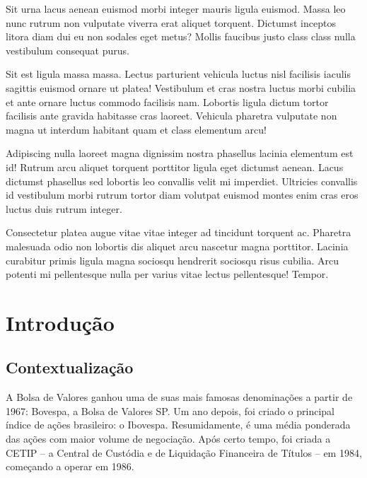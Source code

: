 \documentclass[grad,numbers]{coppe}
\begin{document}
  \begin{foreignabstract}
Sit urna lacus aenean euismod morbi integer mauris ligula euismod. Massa leo nunc rutrum non vulputate viverra erat aliquet torquent. Dictumst inceptos litora diam dui eu non sodales eget metus? Mollis faucibus justo class class nulla vestibulum consequat purus.

Sit est ligula massa massa. Lectus parturient vehicula luctus nisl facilisis iaculis sagittis euismod ornare ut platea! Vestibulum et cras nostra luctus morbi cubilia et ante ornare luctus commodo facilisis nam. Lobortis ligula dictum tortor facilisis ante gravida habitasse cras laoreet. Vehicula pharetra vulputate non magna ut interdum habitant quam et class elementum arcu!

Adipiscing nulla laoreet magna dignissim nostra phasellus lacinia elementum est id! Rutrum arcu aliquet torquent porttitor ligula eget dictumst aenean. Lacus dictumst phasellus sed lobortis leo convallis velit mi imperdiet. Ultricies convallis id vestibulum morbi rutrum tortor diam volutpat euismod montes enim cras eros luctus duis rutrum integer.

Consectetur platea augue vitae vitae integer ad tincidunt torquent ac. Pharetra malesuada odio non lobortis dis aliquet arcu nascetur magna porttitor. Lacinia curabitur primis ligula magna sociosqu hendrerit sociosqu risus cubilia. Arcu potenti mi pellentesque nulla per varius vitae lectus pellentesque! Tempor.
  \end{foreignabstract}
  \tableofcontents

  \listoffigures

  \listoftables

  \printlosymbols
  \printloabbreviations

  \mainmatter

  \hypertarget{introduuxe7uxe3o}{%
  \chapter{Introdução}\label{introduuxe7uxe3o}}
  
  \hypertarget{contextualizauxe7uxe3o}{%
  \section{Contextualização}\label{contextualizauxe7uxe3o}}
  
  A Bolsa de Valores ganhou uma de suas mais famosas denominações a partir de 1967: Bovespa, a Bolsa de Valores SP. Um ano depois, foi criado o principal índice de ações brasileiro: o Ibovespa. Resumidamente, é uma média ponderada das ações com maior volume de negociação. Após certo tempo, foi criada a CETIP -- a Central de Custódia e de Liquidação Financeira de Títulos -- em 1984, começando a operar em 1986.
  
\end{document}

